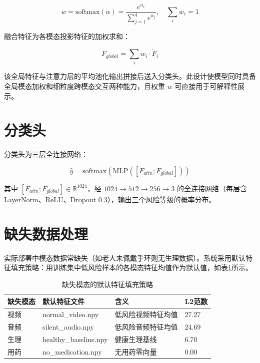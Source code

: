 \begin{equation}
w = \text{softmax}(\alpha) = \frac{e^{\alpha_i}}{\sum_{j=1}^{4} e^{\alpha_j}}, \quad \sum_{i} w_i = 1
\label{eq:modweight}
\end{equation}

融合特征为各模态投影特征的加权求和：

\begin{equation}
F_{global} = \sum_{i} w_i \cdot \tilde{F}_i
\end{equation}

该全局特征与注意力层的平均池化输出拼接后送入分类头。此设计使模型同时具备全局模态加权和细粒度跨模态交互两种能力，且权重 $w$ 可直接用于可解释性展示。

\section{分类头}

分类头为三层全连接网络：

\begin{equation}
\hat{y} = \text{softmax}(\text{MLP}([F_{attn}; F_{global}]))
\end{equation}

其中 $[F_{attn}; F_{global}] \in \mathbb{R}^{1024}$，经 $1024 \to 512 \to 256 \to 3$ 的全连接网络（每层含LayerNorm、ReLU、Dropout 0.3），输出三个风险等级的概率分布。

\section{缺失数据处理}

实际部署中模态数据常缺失（如老人未佩戴手环则无生理数据）。系统采用默认特征填充策略：用训练集中低风险样本的各模态特征均值作为默认值，如表\ref{tab:defaults}所示。

\begin{table}[H]
\centering
\caption{缺失模态的默认特征填充策略}
\label{tab:defaults}
\begin{tabular}{llll}
\toprule
缺失模态 & 默认特征文件 & 含义 & L2范数 \\
\midrule
视频 & normal\_video.npy & 低风险视频特征均值 & 27.27 \\
音频 & silent\_audio.npy & 低风险音频特征均值 & 24.69 \\
生理 & healthy\_baseline.npy & 健康生理基线 & 6.70 \\
用药 & no\_medication.npy & 无用药零向量 & 0.00 \\
\bottomrule
\end{tabular}
\end{table}

